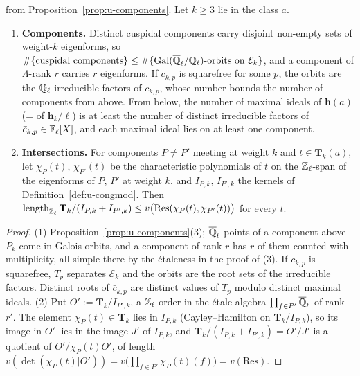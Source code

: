 \documentclass[11pt]{article}
\newcommand{\Iw}{\Lambda}                         %
\newcommand{\hcusp}{\mathbf{h}}                   %
\newcommand{\Tu}{\mathbf{T}}                      %
\newcommand{\Pk}[1]{P_{#1}}                       %
\newcommand{\Ek}{\mathcal{E}}                     %
\newcommand{\Qlb}{\overline{\Q}_\ell}
\newcommand{\Zl}{\Z_\ell}
\newcommand{\Ql}{\Q_\ell}
\begin{document}
\begin{proposition}\label{prop:u-bounds}
\PROVED{} from Proposition~\ref{prop:u-components}. Let $k\ge3$ lie in the class $a$.
\begin{enumerate}
\item \textbf{Components.} Distinct cuspidal components carry disjoint non-empty sets of weight-$k$ eigenforms, so
  $\#\{\text{cuspidal components}\}\le\#\{\mathrm{Gal}(\Qlb/\Ql)\text{-orbits on }\Ek_k\}$, and a component of $\Iw$-rank $r$ carries $r$
  eigenforms. If $c_{k,p}$ is squarefree for some $p$, the orbits are the $\Ql$-irreducible factors of $c_{k,p}$, whose number bounds the
  number of components from above. From below, the number of maximal ideals of $\hcusp(a)$ (= of $\hcusp_k/\ell$) is at least the number of
  distinct irreducible factors of $\bar c_{k,p}\in\mathbb{F}_\ell[X]$, and each maximal ideal lies on at least one component.
\item \textbf{Intersections.} For components $P\ne P'$ meeting at weight $k$ and $t\in\Tu_k(a)$, let $\chi_P(t)$, $\chi_{P'}(t)$ be the
  characteristic polynomials of $t$ on the $\Zl$-span of the eigenforms of $P$, $P'$ at weight $k$, and $I_{P,k}$, $I_{P',k}$ the kernels of
  Definition~\ref{def:u-congmod}. Then
  $\mathrm{length}_{\Zl}\,\Tu_k/(I_{P,k}+I_{P',k})\le v\bigl(\mathrm{Res}(\chi_P(t),\chi_{P'}(t))\bigr)$ for every $t$.
\end{enumerate}
\end{proposition}

\begin{proof}
(1) Proposition~\ref{prop:u-components}(3); $\Qlb$-points of a component above $\Pk{k}$ come in Galois orbits, and a component of rank $r$ has
$r$ of them counted with multiplicity, all simple there by the étaleness in the proof of (3). If $c_{k,p}$ is squarefree, $T_p$ separates
$\Ek_k$ and the orbits are the root sets of the irreducible factors. Distinct roots of $\bar c_{k,p}$ are distinct values of $T_p$ modulo
distinct maximal ideals. (2) Put $O':=\Tu_k/I_{P',k}$, a $\Zl$-order in the étale algebra $\prod_{f\in P'}\Qlb$ of rank $r'$. The element
$\chi_P(t)\in\Tu_k$ lies in $I_{P,k}$ (Cayley--Hamilton on $\Tu_k/I_{P,k}$), so its image in $O'$ lies in the image $J'$ of $I_{P,k}$, and
$\Tu_k/(I_{P,k}+I_{P',k})=O'/J'$ is a quotient of $O'/\chi_P(t)O'$, of length $v(\det(\chi_P(t)|O'))=v\bigl(\prod_{f\in P'}\chi_P(t)(f)\bigr)
=v(\mathrm{Res})$.
\end{proof}
\end{document}
